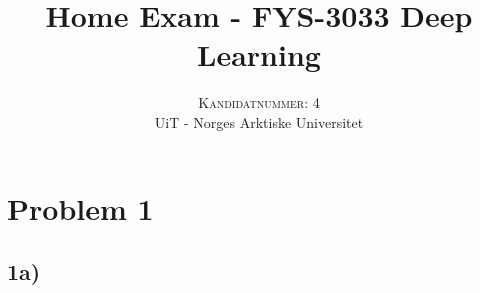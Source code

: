 \documentclass[10pt]{article}
\begin{document}
\title{Home Exam - FYS-3033 Deep Learning}
\author{\large \textsc{Kandidatnummer: 4}\\[2mm]\normalsize UiT - Norges Arktiske Universitet\\[2mm]\small}
\date{}

\maketitle

\section*{Problem 1}

\subsection*{1a)}
\end{document}
